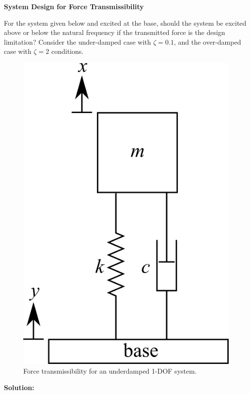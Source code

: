 \documentclass[12pt,letter]{article}
\begin{document}
		\begin{example}
			\textbf{System Design for Force Transmissibility}
			
			\noindent For the system given below and excited at the base, should the system be excited above or below the natural frequency if the transmitted force is the design limitation? Consider the under-damped case with $\zeta=0.1$, and the over-damped case with $\zeta=2$ conditions. 

			\begin{figure}[H]
				\centering
				\includegraphics[]{../figures/1_DOF_spring_dashpot_mass_vertical_base_excited.png}
				\caption{Force transmissibility for an underdamped 1-DOF system.}
			\end{figure}		
		
			\noindent\textbf{Solution:}


\end{example}
\end{document}
